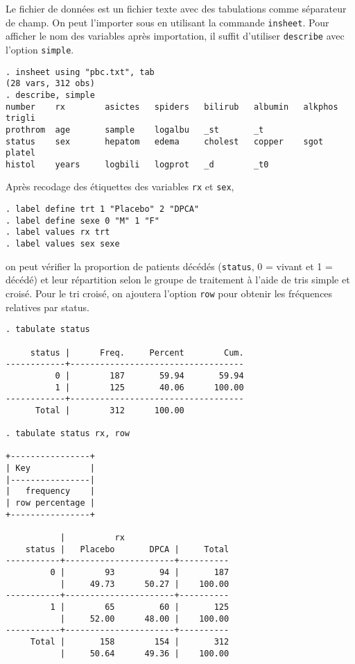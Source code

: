 \soln{\ref{exo:11.2}}
Le fichier de données est un fichier texte avec des tabulations comme
séparateur de champ. On peut l'importer sous \Stata en utilisant la commande
\texttt{insheet}. Pour afficher le nom des variables après importation, il
suffit d'utiliser \texttt{describe} avec l'option \texttt{simple}.
\begin{verbatim}
. insheet using "pbc.txt", tab
(28 vars, 312 obs)
. describe, simple
number    rx        asictes   spiders   bilirub   albumin   alkphos   trigli
prothrom  age       sample    logalbu   _st       _t
status    sex       hepatom   edema     cholest   copper    sgot      platel
histol    years     logbili   logprot   _d        _t0
\end{verbatim}
Après recodage des étiquettes des variables \texttt{rx} et \texttt{sex}, 
\begin{verbatim}
. label define trt 1 "Placebo" 2 "DPCA"
. label define sexe 0 "M" 1 "F"
. label values rx trt
. label values sex sexe
\end{verbatim}
on peut vérifier la proportion de patients décédés (\texttt{status}, 0 =
vivant et 1 = décédé) et leur répartition selon le groupe de traitement à
l'aide de tris simple et croisé. Pour le tri croisé, on ajoutera l'option
\texttt{row} pour obtenir les fréquences relatives par status.
\begin{verbatim}
. tabulate status

     status |      Freq.     Percent        Cum.
------------+-----------------------------------
          0 |        187       59.94       59.94
          1 |        125       40.06      100.00
------------+-----------------------------------
      Total |        312      100.00

. tabulate status rx, row

+----------------+
| Key            |
|----------------|
|   frequency    |
| row percentage |
+----------------+

           |          rx
    status |   Placebo       DPCA |     Total
-----------+----------------------+----------
         0 |        93         94 |       187 
           |     49.73      50.27 |    100.00 
-----------+----------------------+----------
         1 |        65         60 |       125 
           |     52.00      48.00 |    100.00 
-----------+----------------------+----------
     Total |       158        154 |       312 
           |     50.64      49.36 |    100.00
\end{verbatim}

